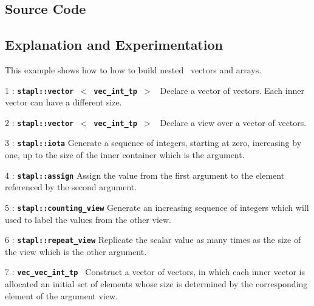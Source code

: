 \documentclass{report}
\begin{document}
\subsection{Source Code}



\subsection{Explanation and Experimentation}

This example shows how to how to build nested \stapl\ vectors and arrays.

\begin{hashitemize}
\item 1 : \texttt{{\bf stapl::vector $<$ vec\_int\_tp $>$ }}
\newline
Declare a vector of vectors.  Each inner vector can have a different size.

\item 2 : \texttt{{\bf stapl::vector $<$ vec\_int\_tp $>$ }}
\newline
Declare a view over a vector of vectors.

\item 3 : \texttt{{\bf stapl::iota}}
\newline
Generate a sequence of integers, starting at zero, increasing by one,
up to the size of the inner container which is the argument.

\item 4 : \texttt{{\bf stapl::assign}}
\newline
Assign the value from the first argument to the element referenced by
the second argument.

\item 5 : \texttt{{\bf stapl::counting\_view}}
\newline
Generate an increasing sequence of integers which will used to label
the values from the other view.

\item 6 : \texttt{{\bf stapl::repeat\_view}}
\newline
Replicate the scalar value as many times as the size of the view
which is the other argument.

\item 7 : \texttt{{\bf vec\_vec\_int\_tp }}
\newline
Construct a vector of vectors, in which each inner vector is allocated
an initial set of elements whose size is determined by the corresponding
element of the argument view.


\end{hashitemize}
\end{document}
